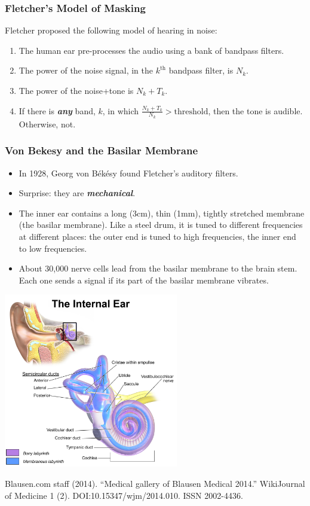 \documentclass{beamer}
\begin{document}
\begin{frame}
  \frametitle{Fletcher's Model of Masking}

  Fletcher proposed the following model of hearing in noise:
  \begin{enumerate}
  \item The human ear pre-processes  the audio using a bank of bandpass filters.
  \item The power of the noise signal, in the $k^{\textrm{th}}$
    bandpass filter, is $N_k$.
  \item The power of the noise+tone is $N_k+T_k$.
  \item If there is {\bf\em any} band, $k$, in which
    $\frac{N_k+T_k}{N_k}>\mbox{threshold}$, then the tone is audible.
    Otherwise, not.
  \end{enumerate}
\end{frame}

\begin{frame}
  \frametitle{Von Bekesy and the Basilar Membrane}

  \begin{itemize}
  \item In 1928, Georg von B{\'{e}}k{\'{e}}sy found Fletcher's auditory
    filters.
  \item Surprise: they are {\bf\em mechanical}.
  \item The inner ear contains a long (3cm), thin (1mm), tightly
    stretched membrane (the basilar membrane).  Like a steel drum, it
    is tuned to different frequencies at different places: the outer
    end is tuned to high frequencies, the inner end to low
    frequencies.
  \item About 30,000 nerve cells lead from the basilar membrane to the
    brain stem.  Each one sends a signal if its part of the basilar
    membrane vibrates.
  \end{itemize}
\end{frame}

\begin{frame}
  \centerline{\includegraphics[height=3in]{Blausen_0329_EarAnatomy_InternalEar.png}}
  \begin{tiny}
    Blausen.com staff (2014). ``Medical gallery of Blausen Medical
    2014.'' WikiJournal of Medicine 1
    (2). DOI:10.15347/wjm/2014.010. ISSN 2002-4436.
  \end{tiny}
\end{frame}
\end{document}
